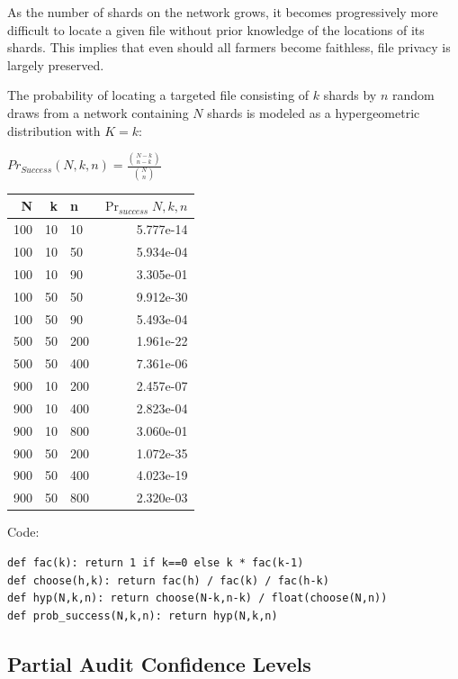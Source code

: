 \documentclass[a4paper,10pt]{article}
\begin{document}
As the number of shards on the network grows, it becomes progressively more
difficult to locate a given file without prior knowledge of the locations of its
shards. This implies that even should all farmers become faithless, file privacy
is largely preserved.

The probability of locating a targeted file consisting of $ k $ shards by $ n $
random draws from a network containing $ N $ shards is modeled as a
hypergeometric distribution with $ K = k $:

{\centering
$Pr_{Success}(N,k,n) = \displaystyle \frac{{N-k \choose n-k}}{{N \choose n}}$
\\}

\begin{table}[hbt!]
\begin{center}
\begin{tabular}{r r l r}
N & k & n & $\Pr_{success}{N,k,n}$\\
\hline 100 & 10 & 10  & 5.777e-14\\
\hline 100 & 10 & 50  & 5.934e-04\\
\hline 100 & 10 & 90  & 3.305e-01\\
\hline 100 & 50 & 50  & 9.912e-30\\
\hline 100 & 50 & 90  & 5.493e-04\\
\hline 500 & 50 & 200 & 1.961e-22\\
\hline 500 & 50 & 400 & 7.361e-06\\
\hline 900 & 10 & 200 & 2.457e-07\\
\hline 900 & 10 & 400 & 2.823e-04\\
\hline 900 & 10 & 800 & 3.060e-01\\
\hline 900 & 50 & 200 & 1.072e-35\\
\hline 900 & 50 & 400 & 4.023e-19\\
\hline 900 & 50 & 800 & 2.320e-03\\
\end{tabular}
\end{center}
\end{table}

Code:
\begin{lstlisting}
def fac(k): return 1 if k==0 else k * fac(k-1)
def choose(h,k): return fac(h) / fac(k) / fac(h-k)
def hyp(N,k,n): return choose(N-k,n-k) / float(choose(N,n))
def prob_success(N,k,n): return hyp(N,k,n)
\end{lstlisting}

\subsection{Partial Audit Confidence Levels}
\end{document}
